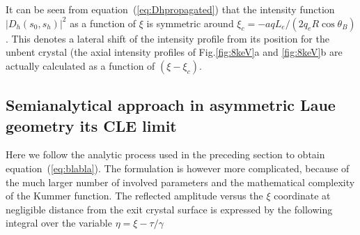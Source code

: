 \documentclass[preprint]{iucr}              %
\newcommand{\todo}[1]{{\color{red}[TODO: "#1'']}}
\newcommand{\inred}[1]{{\color{red}#1}}
\begin{document}
It can be seen from equation~(\ref{eq:Dhpropagated}) that the intensity function $|D_h(s_0,s_h)|^2$ as a function of $\xi$ is symmetric around $\xi_c=-a q L_e / (2 q_e R \cos\theta_B)$. This denotes a lateral shift of the intensity profile \inred{from its position for the unbent crystal} (the axial intensity profiles of Fig.\ref{fig:8keV}a and \ref{fig:8keV}b are actually calculated as a function of $(\xi-\xi_c)$.

\subsection{Semianalytical approach in asymmetric Laue geometry \inred{its CLE limit}}
\label{sec:LaueCompatibilityCLE}


\inred{Here we follow the analytic process used in the preceding section to obtain equation~(\ref{eq:blabla}). The formulation is however more complicated, because of the much larger number of involved parameters and the mathematical complexity of the Kummer function. 
}
The reflected amplitude versus the $\xi$ coordinate at negligible distance from the exit crystal surface is expressed by the following integral over the variable $\eta=\xi-\tau/\gamma$
\end{document}
